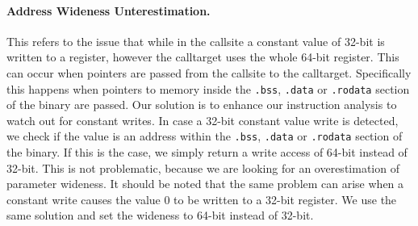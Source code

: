 \paragraph{Address Wideness Unterestimation.} This refers to the issue that while in the callsite a constant value of 32-bit is written to a register, however 
the calltarget uses the whole 64-bit register. This can occur when pointers are passed from the callsite to the calltarget. Specifically this happens 
when pointers to memory inside the \texttt{.bss}, \texttt{.data} or \texttt{.rodata} section of the binary are passed.
Our solution is to enhance our instruction analysis to watch out for constant writes. In case a 32-bit constant value write is detected, we check if the
value is an address within the \texttt{.bss}, \texttt{.data} or \texttt{.rodata} section of the binary. If this is the case, we simply return a write access of 64-bit 
instead of 32-bit. This is not problematic, because we are looking for an overestimation of parameter wideness.
It should be noted that the same problem can arise when a constant write causes the value 0 to be written to a 32-bit register. We use the same solution
and set the wideness to 64-bit instead of 32-bit.
%
%
%
